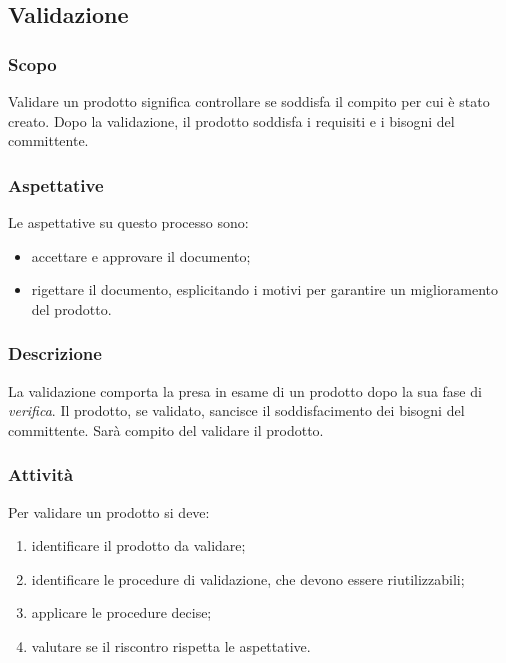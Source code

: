 \subsection{Validazione}\label{3.5}

\subsubsection{Scopo}\label{3.5.1}
Validare un prodotto significa controllare se soddisfa il compito per cui è stato creato. Dopo la validazione, il prodotto soddisfa i requisiti e i bisogni del committente.

\subsubsection{Aspettative}
Le aspettative su questo processo sono:
\begin{itemize}
	\item accettare e approvare il documento;
	\item rigettare il documento, esplicitando i motivi per garantire un miglioramento del prodotto.
\end{itemize}

\subsubsection{Descrizione}
La validazione comporta la presa in esame di un prodotto dopo la sua fase di \textit{verifica}. Il prodotto, se validato, sancisce il soddisfacimento dei bisogni del committente. Sarà compito del \respProg{} validare il prodotto.

\subsubsection{Attività}
Per validare un prodotto si deve:
\begin{enumerate}
	\item identificare il prodotto da validare;
	\item identificare le procedure di validazione, che devono essere riutilizzabili;
	\item applicare le procedure decise;
	\item valutare se il riscontro rispetta le aspettative.
\end{enumerate}


